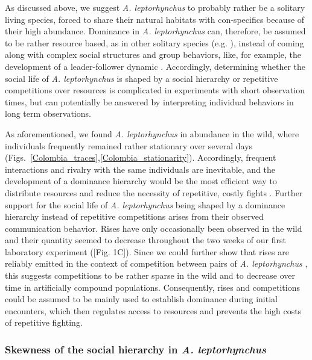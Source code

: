 \documentclass[11pt,pdftex]{article}
\newcommand{\fref}[1]{\textup{\ref{#1}}}
\newcommand{\figs}{Figs.}
\newcommand{\figsref}[1]{\figs~\fref{#1}}
\newcommand{\note}[2][]{\textcolor{red!80!black}{[\textbf{\ifthenelse{\equal{#1}{}}{}{#1: }}#2]}}
\newcommand{\notetr}[1]{\note[TR]{#1}}
\newcommand{\lepto}{\textit{A. leptorhynchus}}
\begin{document}
As discussed above, we suggest \lepto{} to probably rather be a solitary living species, forced to share their natural habitats with con-specifics because of their high abundance. Dominance in \lepto{} can, therefore, be assumed to be rather resource based, as in other solitary species (e.g. \citealp{Cigliano1993}), instead of coming along with complex social structures and group behaviors, like, for example, the development of a leader-follower dynamic \citep{Strandburg2018}. Accordingly, determining whether the social life of \lepto{} is shaped by a social hierarchy or repetitive competitions over resources is complicated in experiments with short observation times, but can potentially be answered by interpreting individual behaviors in long term observations. 

As aforementioned, we found \lepto{} in abundance in the wild, where individuals frequently remained rather stationary over several days (\figsref{Colombia_traces},\fref{Colombia_stationarity}). Accordingly, frequent interactions and rivalry with the same individuals are inevitable, and the development of a dominance hierarchy would be the most efficient way to distribute resources and reduce the necessity of repetitive, costly fights \citep{Sapolsky2005}. Further support for the social life of \lepto{} being shaped by a dominance hierarchy instead of repetitive competitions arises from their observed communication behavior. Rises have only occasionally been observed in the wild and their quantity seemed to decrease throughout the two weeks of our first laboratory experiment (\notetr{Fig. 1C}). Since we could further show that rises are reliably emitted in the context of competition between pairs of \lepto{} \citep{Raab2021}, this suggests competitions to be rather sparse in the wild and to decrease over time in artificially compound populations. Consequently, rises and competitions could be assumed to be mainly used to establish dominance during initial encounters, which then regulates access to resources and prevents the high costs of repetitive fighting.

\subsubsection{Skewness of the social hierarchy in \lepto{}}
\end{document}
